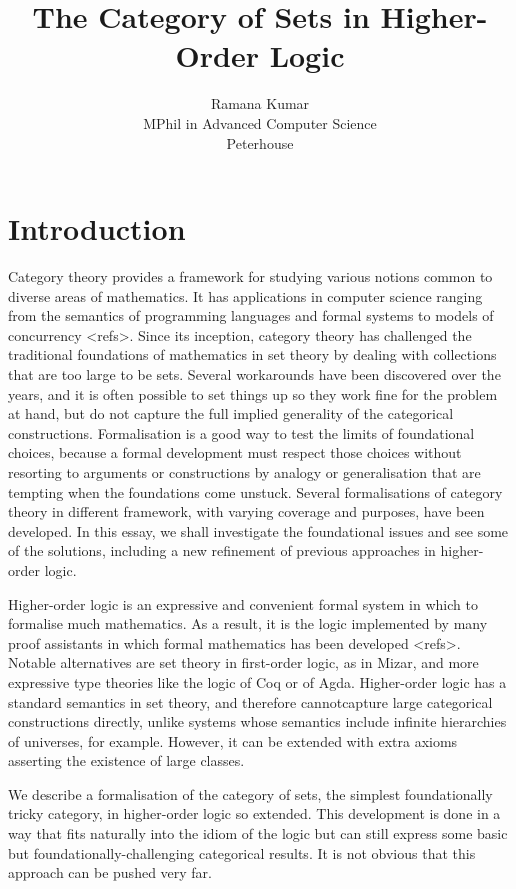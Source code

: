 \documentclass[twoside,titlepage,11pt]{article}
\title{The Category of Sets in Higher-Order Logic}
\author{Ramana Kumar\\MPhil in Advanced Computer Science\\Peterhouse}
\begin{document}
\maketitle
\section{Introduction}%
Category theory provides a framework for studying various notions common to diverse areas of mathematics.
It has applications in computer science ranging from the semantics of programming languages and formal systems to models of concurrency <refs>.
Since its inception, category theory has challenged the traditional foundations of mathematics in set theory by dealing with collections that are too large to be sets. 
Several workarounds have been discovered over the years, and it is often possible to set things up so they work fine for the problem at hand, but do not capture the full implied generality of the categorical constructions.
Formalisation is a good way to test the limits of foundational choices, because a formal development must respect those choices without resorting to arguments or constructions by analogy or generalisation that are tempting when the foundations come unstuck.
Several formalisations of category theory in different framework, with varying coverage and purposes, have been developed.
In this essay, we shall investigate the foundational issues and see some of the solutions, including a new refinement of previous approaches in higher-order logic.

Higher-order logic is an expressive and convenient formal system in which to formalise much mathematics.
As a result, it is the logic implemented by many proof assistants in which formal mathematics has been developed <refs>.
Notable alternatives are set theory in first-order logic, as in Mizar, and more expressive type theories like the logic of Coq or of Agda.
Higher-order logic has a standard semantics in set theory, and therefore cannotcapture large categorical constructions directly, unlike systems whose semantics include infinite hierarchies of universes, for example.
However, it can be extended with extra axioms asserting the existence of large classes.

We describe a formalisation of the category of sets, the simplest foundationally tricky category, in higher-order logic so extended.
This development is done in a way that fits naturally into the idiom of the logic but can still express some basic but foundationally-challenging categorical results.
It is not obvious that this approach can be pushed very far.
\end{document}
